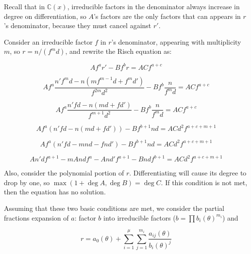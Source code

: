 Recall that in ${\mathbb C}(x)$, irreducible factors in the
denominator always increase in degree on differentiation, so $A$'s
factors are the only factors that can appears in $r$'s denominator,
because they must cancel against $r'$.

Consider an irreducible factor $f$ in $r$'s denominator, appearing with
multiplicity $m$, so $r = n/(f^m d)$, and rewrite the Risch equation as:

\begin{comment}
$$A f^a r' - B f^b r = C f^c$$

$$A f^a \frac{n' f^m d - n(m f^{m-1} d + f^m d')}{f^{2m} d^2} - B f^b \frac{n}{f^m d} = C f^c$$

$$A f^a \frac{n' f d - n(m d + f d')}{f^{m+1} d^2} - B f^b \frac{n}{f^m d} = C f^c$$

$$A f^a (n' f d - n(m d + f d')) - B f^{b+1} n d = C d^2 f^{c+m+1} $$

$$A f^a (n' f d - m n d - f n d') - B f^{b+1} n d = C d^2 f^{c+m+1} $$

$$A n' d f^{a+1} - m A n d f^a - A n d' f^{a+1} - B n d f^{b+1} = C d^2 f^{c+m+1} $$
\end{comment}

$$A f^a r' - B f^b r = A C f^{a+c}$$

$$A f^a \frac{n' f^m d - n(m f^{m-1} d + f^m d')}{f^{2m} d^2} - B f^b \frac{n}{f^m d} = A C f^{a+c}$$

$$A f^a \frac{n' f d - n(m d + f d')}{f^{m+1} d^2} - B f^b \frac{n}{f^m d} = A C f^{a+c}$$

$$A f^a (n' f d - n(m d + f d')) - B f^{b+1} n d = A C d^2 f^{a+c+m+1} $$

$$A f^a (n' f d - m n d - f n d') - B f^{b+1} n d = A C d^2 f^{a+c+m+1} $$

$$A n' d f^{a+1} - m A n d f^a - A n d' f^{a+1} - B n d f^{b+1} = A C d^2 f^{a+c+m+1} $$




Also, consider the polynomial portion of $r$.  Differentiating
will cause its degree to drop by one, so $\max(1 + \deg A, \deg B) = \deg C$.
If this condition is not met, then the equation has no solution.

Assuming that these two basic conditions are met, we consider 
the partial fractions expansion of $a$:
factor $b$ into irreducible factors ($b=\prod b_i(\theta)^{m_i}$) and

$$r = a_0(\theta) + \sum_{i=1}^\mu \sum_{j=1}^{m_i} \frac{a_{ij}(\theta)}{b_i(\theta)^j}$$

